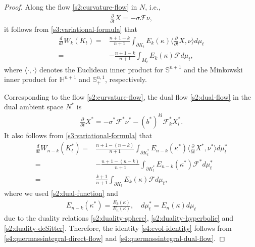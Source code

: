 \documentclass[11pt,reqno]{amsart}
\theoremstyle{definition}
\theoremstyle{remark}
\numberwithin{equation}{section}
\renewcommand{\(}{\left(}
\renewcommand{\)}{\right)}
\renewcommand{\~}{\tilde}
\renewcommand{\-}{\overline}
\renewcommand{\k}{\kappa}
\newcommand{\s}{\sigma}
\begin{document}
\begin{proof}
	Along the flow \eqref{s2:curvature-flow} in $N$, i.e.,
	\begin{align*}
	\frac{\partial}{\partial t}X=-\s \mathcal{F}\nu,
	\end{align*}
	it follows from \eqref{s3:variational-formula} that
	\begin{align}\label{s4:quermassintegral-direct-flow}
	\frac{d}{dt}W_k(K_t)=&\frac{n+1-k}{n+1}\int_{\partial K_t} E_k(\k) \langle \frac{\partial}{\partial t}X,\nu\rangle d\mu_t\nonumber \\ 
	=&-\frac{n+1-k}{n+1}\int_{M_t} E_k(\k) \mathcal{F} d\mu_t,
	\end{align}
	where $\langle \cdot,\cdot\rangle$ denotes the Euclidean inner product for $\mathbb S^{n+1}$ and the Minkowski inner product for $\mathbb H^{n+1}$ and $\mathbb S^{n,1}_{+}$, respectively.
	 
	Corresponding to the flow \eqref{s2:curvature-flow}, the dual flow \eqref{s2:dual-flow} in the dual ambient space $N^\ast$ is 
	\begin{align}
	\frac{\partial}{\partial t}X^\ast=-\s^\ast \mathcal{F}^\ast \nu^\ast-(b^\ast)^{kl}\mathcal{F}^\ast_k X^\ast_l.
	\end{align}
	It also follows from \eqref{s3:variational-formula} that
	\begin{align}\label{s4:quermassintegral-dual-flow}
	\frac{d}{dt}W_{n-k}(K^\ast_t)=&\frac{n+1-(n-k)}{n+1}\int_{\partial K^\ast_t} E_{n-k}(\k^\ast) \langle \frac{\partial}{\partial t}X^\ast, \nu^\ast \rangle d\mu^\ast_t \nonumber\\
	=&-\frac{n+1-(n-k)}{n+1}\int_{\partial K^\ast_t} E_{n-k}(\k^\ast) \mathcal{F}^\ast d\mu^\ast_t \nonumber\\
	=&\frac{k+1}{n+1}\int_{\partial K_t} E_k(\k) \mathcal{F} d\mu_t,
	\end{align}
	where we used \eqref{s2:dual-function} and 
	\begin{align*}
	E_{n-k}(\k^\ast)=\frac{E_k(\k)}{E_{n}(\k)}, \quad d\mu^\ast_t=E_n(\k) d\mu_t
	\end{align*}
	due to the duality relations \eqref{s2:duality-sphere}, \eqref{s2:duality-hyperbolic} and \eqref{s2:duality-deSitter}. Therefore, the identity \eqref{s4:evol-identity} follows from \eqref{s4:quermassintegral-direct-flow} and \eqref{s4:quermassintegral-dual-flow}.	
\end{proof}
\end{document}
